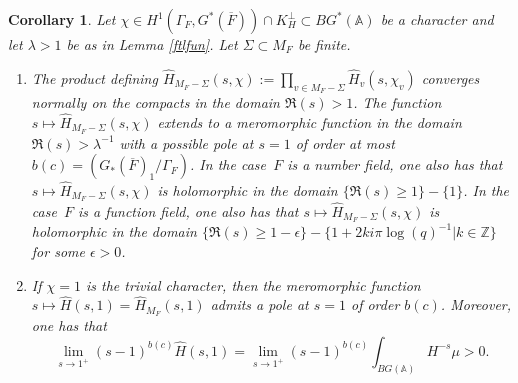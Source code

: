 \documentclass[a4paper,english,12pt]{amsart}
\newcommand{\oF}{\overline F}
\newcommand{\ZZ}{\mathbb{Z}}
\newcommand{\AAA}{\mathbb A}
\newcommand{\wH}{\widehat H}
\newtheorem{cor}[equation]{Corollary}
\numberwithin{equation}{subsection}
\begin{document}
\begin{cor}\label{trivialcharacter}
Let $\chi\in H^1(\Gamma_F, G^*(\oF))\cap K_H^\perp\subset BG^*(\AAA)$ be a character and let $\lambda>1$ be as in Lemma \ref{ftlfun}.  Let $\Sigma\subset M_F$ be finite.
\begin{enumerate}
\item The product defining $\wH_{M_F-\Sigma}(s, \chi):=\prod_{v\in M_F-\Sigma}\wH_v(s,\chi_v)$ converges normally on the compacts in the domain $\Re(s)>1$. The function $s\mapsto\wH_{M_F-\Sigma}(s,\chi)$ extends to a meromorphic function in the domain $\Re(s)> \lambda^{-1}$ with a possible pole at $s=1$ of order at most $b(c)=(G_*(\oF)_1/\Gamma_F)$. In the case~$F$ is a number field, one also has that $s\mapsto\wH_{M_F-\Sigma}(s,\chi)$ is holomorphic in the domain $\{\Re(s)\geq 1\}-\{1\}$. In the case~$F$ is a function field, one also has that $s\mapsto\wH_{M_F-\Sigma}(s,\chi)$ is holomorphic in the domain $\{\Re(s)\geq 1-\epsilon\}-\{1+2ki\pi\log(q)^{-1}|k\in\ZZ\}$ for some $\epsilon>0$.
\item If $\chi=1$ is the trivial character, then the meromorphic function $s\mapsto\wH(s,1)=\wH_{M_F}(s,1)$ admits a pole at $s=1$ of order $b(c)$. Moreover, one has that $$\lim_{s\to 1^+}(s-1)^{b(c)}\wH(s,1)=\lim_{s\to 1^+}(s-1)^{b(c)}\int_{BG(\AAA)}H^{-s}\mu>0.$$
\end{enumerate}
\end{cor}
\end{document}
